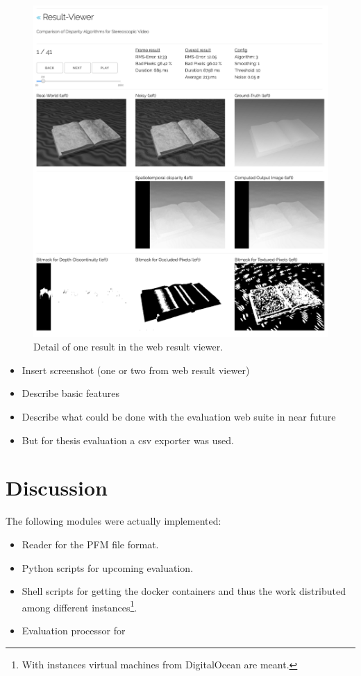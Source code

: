\begin{figure}[p!]
  \centering
  \includegraphics[angle=90,width=1.0\textwidth]{src/images/result-viewer-detail.png}
  \caption{Detail of one result in the web result viewer.}
  \label{fig:web-detail}
\end{figure}

\begin{itemize}
  \item Insert screenshot (one or two from web result viewer)
  \item Describe basic features
  \item Describe what could be done with the evaluation web suite in near future
  \item But for thesis evaluation a csv exporter was used.
\end{itemize}

\section{Discussion}

The following modules were actually implemented:

\begin{itemize}
  \item Reader for the PFM file format.
  \item Python scripts for upcoming evaluation.
  \item Shell scripts for getting the docker containers and thus the work distributed among different instances\footnote{With instances virtual machines from DigitalOcean are meant.}.
  \item Evaluation processor for
\end{itemize}
